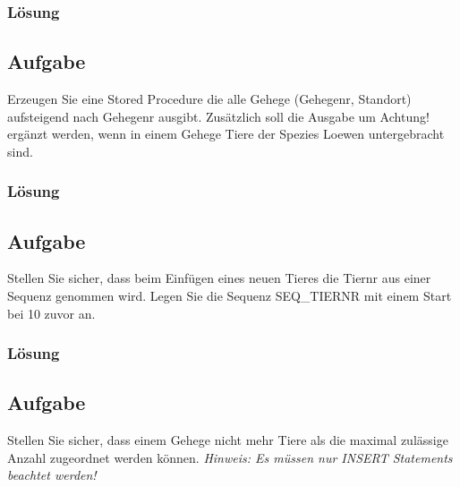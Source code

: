\subsubsection*{Lösung}
\label{subsubsec:uebung_01.aufgabe_6.loesung}


\subsection{Aufgabe}
\label{subsec:uebung_01.aufgabe_07}
Erzeugen Sie eine Stored Procedure die alle Gehege (Gehegenr, Standort) aufsteigend nach Gehegenr ausgibt. Zusätzlich soll die Ausgabe um Achtung! ergänzt werden, wenn in einem Gehege Tiere der Spezies Loewen untergebracht sind.

\subsubsection*{Lösung}
\label{subsubsec:uebung_01.aufgabe_7.loesung}


\subsection{Aufgabe}
\label{subsec:uebung_01.aufgabe_08}
Stellen Sie sicher, dass beim Einfügen eines neuen Tieres die Tiernr aus einer Sequenz genommen wird. Legen Sie die Sequenz SEQ\_TIERNR mit einem Start bei 10 zuvor an.

\subsubsection*{Lösung}
\label{subsubsec:uebung_01.aufgabe_8.loesung}


\subsection{Aufgabe}
\label{subsec:uebung_01.aufgabe_09}
Stellen Sie sicher, dass einem Gehege nicht mehr Tiere als die maximal zulässige Anzahl zugeordnet werden können.
\textit{Hinweis: Es müssen nur INSERT Statements beachtet werden!}

